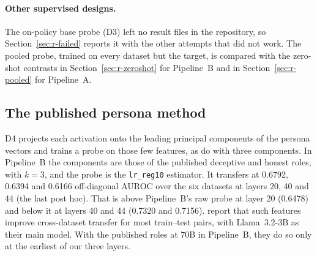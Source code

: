 \paragraph{Other supervised designs.} The on-policy base probe (D3) left no result files in the repository, so Section~\ref{sec:r-failed} reports it with the other attempts that did not work. %
The pooled probe, trained on every dataset but the target, is compared with the zero-shot contrasts in Section~\ref{sec:r-zeroshot} for Pipeline~B and in Section~\ref{sec:r-pooled} for Pipeline~A.

\subsection{The published persona method}
\label{sec:r-d4}

D4 projects each activation onto the leading principal components of the persona vectors and trains a probe on those few features, as \textcite[p.~3]{mahadik2026persona} do with three components.
In Pipeline~B the components are those of the published deceptive and honest roles, with $k=3$, and the probe is the \texttt{lr\_reg10} estimator. %
It transfers at 0.6792, 0.6394 and 0.6166 off-diagonal AUROC over the six datasets at layers 20, 40 and 44 (the last post hoc). %
That is above Pipeline~B's raw probe at layer 20 (0.6478) and below it at layers 40 and 44 (0.7320 and 0.7156). %
\textcite[p.~4]{mahadik2026persona} report that such features improve cross-dataset transfer for most train--test pairs, with Llama~3.2-3B as their main model. %
With the published roles at 70B in Pipeline~B, they do so only at the earliest of our three layers. %

